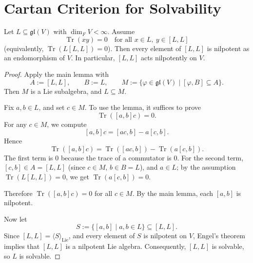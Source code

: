 \section{Cartan Criterion for Solvability}

\begin{proposition}
    Let $L \subseteq \mathfrak{gl}(V)$ with $\dim_F V<\infty$. Assume
    \[
        \operatorname{Tr}(xy)=0 \quad \text{for all }x\in L,\ y\in [L,L]
    \]
    (equivalently, $\operatorname{Tr}(L[L,L])=0$). Then every element of $[L,L]$ is nilpotent as an endomorphism of $V$. In particular, $[L,L]$ acts nilpotently on $V$.
\end{proposition}

\begin{proof}
    Apply the main lemma with
    \[
        A:=[L,L],\qquad B:=L,\qquad
        M:=\{\varphi\in\mathfrak{gl}(V)\mid [\varphi,B]\subseteq A\}.
    \]
    Then $M$ is a Lie subalgebra, and $L\subseteq M$.

    Fix $a,b\in L$, and set $c \in M$.
    To use the lemma, it suffices to prove
    \[
        \operatorname{Tr}([a,b]c)=0.
    \]
    For any $c\in M$, we compute
    \[
        [a,b]c=[ac,b]-a[c,b].
    \]
    Hence
    \[
        \operatorname{Tr}([a,b]c)=\operatorname{Tr}([ac,b])-\operatorname{Tr}(a[c,b]).
    \]
    The first term is $0$ because the trace of a commutator is $0$.
    For the second term, $[c,b]\in A=[L,L]$ (since $c\in M$, $b\in B=L$), and $a\in L$; by the assumption $\operatorname{Tr}(L[L,L])=0$, we get $\operatorname{Tr}(a[c,b])=0$.

    Therefore $\operatorname{Tr}([a,b]c)=0$ for all $c\in M$. By the main lemma, each $[a,b]$ is nilpotent.

    Now let
    \[
        S:=\{[a,b]\mid a,b\in L\}\subseteq [L,L].
    \]
    Since $[L,L]=\langle S\rangle_{\text{Lie}}$, and every element of $S$ is nilpotent on $V$, Engel's theorem implies that $[L,L]$ is a nilpotent Lie algebra. Consequently, $[L,L]$ is solvable, so $L$ is solvable.
\end{proof}

